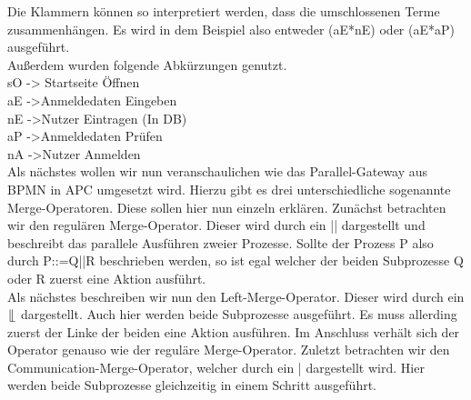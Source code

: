 Die Klammern können so interpretiert werden, dass die umschlossenen Terme zusammenhängen. Es wird in dem Beispiel also entweder (aE*nE) oder (aE*aP) ausgeführt.\\
Außerdem wurden folgende Abkürzungen genutzt.\\
sO -> Startseite Öffnen\\
aE ->Anmeldedaten Eingeben\\
nE ->Nutzer Eintragen (In DB)\\
aP ->Anmeldedaten Prüfen\\
nA ->Nutzer Anmelden\\
Als nächstes wollen wir nun veranschaulichen wie das Parallel-Gateway aus BPMN in APC umgesetzt wird. Hierzu gibt es drei unterschiedliche sogenannte Merge-Operatoren. Diese sollen hier nun einzeln erklären.
Zunächst betrachten wir den regulären Merge-Operator. Dieser wird durch ein || dargestellt und beschreibt das parallele Ausführen zweier Prozesse. Sollte der Prozess P also durch P::=Q||R beschrieben werden, so ist egal welcher der beiden Subprozesse Q oder R zuerst eine Aktion ausführt.\\
Als nächstes beschreiben wir nun den Left-Merge-Operator. Dieser wird durch ein $\lfloor \hspace{-0.25em} \lfloor$ dargestellt. Auch hier werden beide Subprozesse ausgeführt. Es muss allerding zuerst der Linke der beiden eine Aktion ausführen. Im Anschluss verhält sich der Operator genauso wie der reguläre Merge-Operator. Zuletzt betrachten wir den Communication-Merge-Operator, welcher durch ein | dargestellt wird. Hier werden beide Subprozesse gleichzeitig in einem Schritt ausgeführt.
